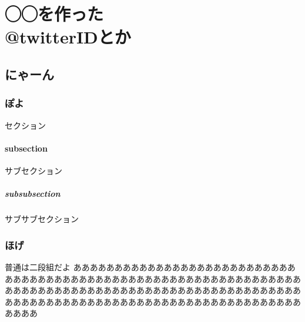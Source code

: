 \documentclass[b5paper, 9pt, twocolumn, titlepage, uplatex]{jsbook}	%
\begin{document}
	

\part{◯◯を作った \\@twitterIDとか}
\chapter{にゃーん}

	\section{ぽよ}
	セクション\cite{cubemxmanual1}
	
	\subsection{subsection}
	サブセクション
	
	\subsubsection{subsubsection}
	サブサブセクション
	
	\section{ほげ}
	
\begin{comment}	
	この中身は本文に入らない
\end{comment}

普通は二段組だよ
あああああああああああああああああああああああああああああああああああああああああああああああああああああああああああああああああああああああああああああああああああああああああああああああああああああああああああああああああああああああああああああああああああああああああああ
\end{document}
